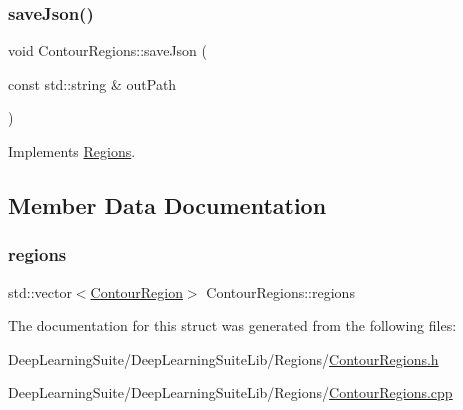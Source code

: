 \mbox{\label{struct_contour_regions_a78fc9a246628abb76f5765c4102847e4}} 
\subsubsection{\texorpdfstring{save\+Json()}{saveJson()}}
{\footnotesize\ttfamily void Contour\+Regions\+::save\+Json (\begin{DoxyParamCaption}\item[{const std\+::string \&}]{out\+Path }\end{DoxyParamCaption})\hspace{0.3cm}{\ttfamily [virtual]}}



Implements \hyperlink{struct_regions_a402078d4ff67e4aee31b231c2d1942c6}{Regions}.



\subsection{Member Data Documentation}
\mbox{\label{struct_contour_regions_a83c5e91699fe55a1306426ddbbcce7b6}} 
\subsubsection{\texorpdfstring{regions}{regions}}
{\footnotesize\ttfamily std\+::vector$<$\hyperlink{struct_contour_region}{Contour\+Region}$>$ Contour\+Regions\+::regions}



The documentation for this struct was generated from the following files\+:\begin{DoxyCompactItemize}
\item 
Deep\+Learning\+Suite/\+Deep\+Learning\+Suite\+Lib/\+Regions/\hyperlink{_contour_regions_8h}{Contour\+Regions.\+h}\item 
Deep\+Learning\+Suite/\+Deep\+Learning\+Suite\+Lib/\+Regions/\hyperlink{_contour_regions_8cpp}{Contour\+Regions.\+cpp}\end{DoxyCompactItemize}
